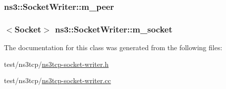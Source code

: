 \subsubsection[{\texorpdfstring{m\+\_\+peer}{m_peer}}]{ ns3\+::\+Socket\+Writer\+::m\+\_\+peer\hspace{0.3cm}{\ttfamily [private]}}\hypertarget{classns3_1_1SocketWriter_a12642367feaffae4025998e57c66e9d6}{}\label{classns3_1_1SocketWriter_a12642367feaffae4025998e57c66e9d6}
\subsubsection[{\texorpdfstring{m\+\_\+socket}{m_socket}}]{$<${\bf Socket}$>$ ns3\+::\+Socket\+Writer\+::m\+\_\+socket\hspace{0.3cm}{\ttfamily [private]}}\hypertarget{classns3_1_1SocketWriter_acac6d81dbeee13777f27140b054a0a57}{}\label{classns3_1_1SocketWriter_acac6d81dbeee13777f27140b054a0a57}


The documentation for this class was generated from the following files\+:\begin{DoxyCompactItemize}
\item 
test/ns3tcp/\hyperlink{ns3tcp-socket-writer_8h}{ns3tcp-\/socket-\/writer.\+h}\item 
test/ns3tcp/\hyperlink{ns3tcp-socket-writer_8cc}{ns3tcp-\/socket-\/writer.\+cc}\end{DoxyCompactItemize}
